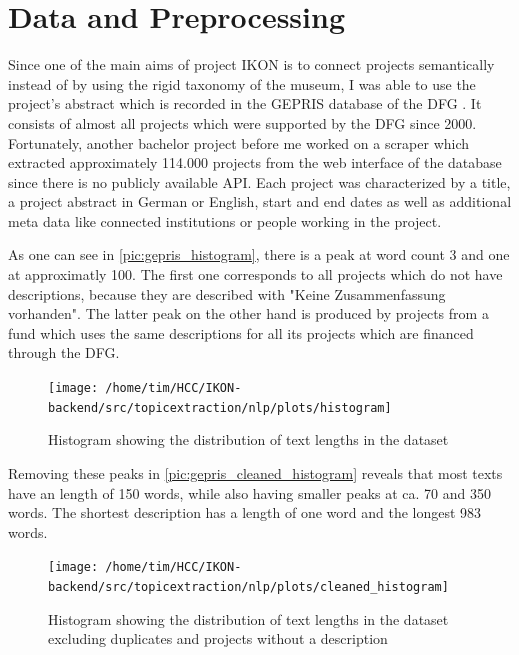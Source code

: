 \section{Data and Preprocessing}
Since one of the main aims of project IKON is to connect projects semantically instead of by using the rigid taxonomy of the museum, I was able to use the project's abstract which is recorded in the GEPRIS database of the DFG \cite{DFGGEPRIS}. It consists of almost all projects which were supported by the DFG since 2000. Fortunately, another bachelor project before me worked on a scraper which extracted approximately 114.000 projects from the web interface of the database since there is no publicly available API. Each project was characterized by a title, a project abstract in German or English, start and end dates as well as additional meta data like connected institutions or people working in the project.

As one can see in \autoref{pic:gepris_histogram}, there is a peak at word count 3 and one at approximatly 100. The first one corresponds to all projects which do not have descriptions, because they are described with "Keine Zusammenfassung vorhanden". The latter peak on the other hand is produced by projects from a fund which uses the same descriptions for all its projects which are financed through the DFG.

\begin{figure}[t]
	\centering
	\texttt{[image: /home/tim/HCC/IKON-backend/src/topicextraction/nlp/plots/histogram]}
	\caption{\label{pic:gepris_histogram} Histogram showing the distribution of text lengths in the dataset}
\end{figure}

Removing these peaks in \autoref{pic:gepris_cleaned_histogram} reveals that most texts have an length of 150 words, while also having smaller peaks at ca. 70 and 350 words. The shortest description has a length of one word and the longest  983 words.

\begin{figure}[t]
	\centering
	\texttt{[image: /home/tim/HCC/IKON-backend/src/topicextraction/nlp/plots/cleaned\_histogram]}
	\caption{\label{pic:gepris_cleaned_histogram} Histogram showing the distribution of text lengths in the dataset excluding duplicates and projects without a description}
\end{figure}

